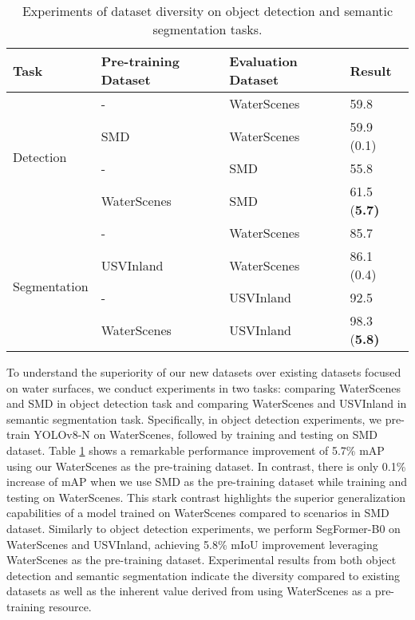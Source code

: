 \documentclass[lettersize,journal]{IEEEtran}
\begin{document}
\begin{table}[htbp]
\caption{Experiments of dataset diversity on object detection and semantic segmentation tasks.}
\center
\footnotesize
\begin{tabular*}{1\linewidth}{
p{1.4cm}<{}
p{2.4cm}<{\centering}
p{2.2cm}<{\centering}
p{1.3cm}<{\centering}
}
\toprule
\bf{Task} & \bf{Pre-training Dataset} & \bf{Evaluation Dataset} & \bf{Result} \\\midrule
\multirow{4}{*}{Detection} 
& - & WaterScenes & 59.8 \\
& SMD & WaterScenes & 59.9 (0.1) \\ \cmidrule(lr){2-4}
& - & SMD & 55.8 \\
& WaterScenes & SMD & 61.5 (\bf{5.7}) \\ \midrule

\multirow{4}{*}{Segmentation} 
& - & WaterScenes & 85.7 \\
& USVInland & WaterScenes & 86.1 (0.4) \\ \cmidrule(lr){2-4}
& - & USVInland & 92.5 \\
& WaterScenes & USVInland & 98.3 (\bf{5.8}) \\
\bottomrule
\end{tabular*}
\vspace{1mm}
\label{tab:domain-gap-1}
\end{table}

To understand the superiority of our new datasets over existing datasets focused on water surfaces, we conduct experiments in two tasks: comparing WaterScenes and SMD \cite{moosbauer2019benchmark} in object detection task and comparing WaterScenes and USVInland \cite{cheng2021we} in semantic segmentation task. 
Specifically, in object detection experiments, we pre-train YOLOv8-N \cite{yolov8} on WaterScenes, followed by training and testing on SMD dataset.
Table \ref{tab:domain-gap-1} shows a remarkable performance improvement of 5.7\% mAP using our WaterScenes as the pre-training dataset. 
In contrast, there is only 0.1\% increase of mAP when we use SMD as the pre-training dataset while training and testing on WaterScenes. 
This stark contrast highlights the superior generalization capabilities of a model trained on WaterScenes compared to scenarios in SMD dataset.
Similarly to object detection experiments, we perform SegFormer-B0 \cite{xie2021segformer} on WaterScenes and USVInland, achieving 5.8\% mIoU improvement leveraging WaterScenes as the pre-training dataset.
Experimental results from both object detection and semantic segmentation indicate the diversity compared to existing datasets as well as the inherent value derived from using WaterScenes as a pre-training resource. 
\end{document}
